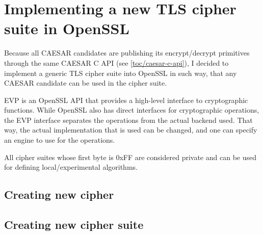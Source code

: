 \chapter{Implementing a new TLS cipher suite in OpenSSL}


Because all CAESAR candidates are publishing its encrypt/decrypt primitives through the same CAESAR C API (see \autoref{toc/caesar-c-api}), I decided to implement a generic TLS cipher suite into OpenSSL in such way, that any CAESAR candidate can be used in the cipher suite.

EVP is an OpenSSL API that provides a high-level interface to cryptographic functions. While OpenSSL also has direct interfaces for cryptographic operations, the EVP interface separates the operations from the actual backend used. That way, the actual implementation that is used can be changed, and one can specify an engine to use for the operations.

All cipher suites whose first byte is 0xFF are considered private and can be used for defining local/experimental algorithms. \cite[p.~55]{rfc2246}



\section{Creating new cipher}

\section{Creating new cipher suite}
